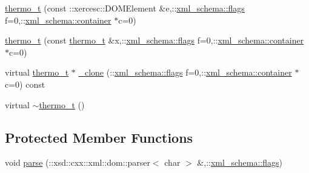 \begin{DoxyCompactItemize}
\item 
\hyperlink{classthermo__t_a9d2453469c50d26154ad9126e93da768}{thermo\-\_\-t} (const \-::xercesc\-::\-D\-O\-M\-Element \&e,\-::\hyperlink{namespacexml__schema_a0612287d030cb2732d31a45b258fdc87}{xml\-\_\-schema\-::flags} f=0,\-::\hyperlink{namespacexml__schema_ada9aa30dc722e93ee2ed7243085402a5}{xml\-\_\-schema\-::container} $\ast$c=0)
\item 
\hyperlink{classthermo__t_a524ba6dfc3781a5ee2a86e674097ff00}{thermo\-\_\-t} (const \hyperlink{classthermo__t}{thermo\-\_\-t} \&x,\-::\hyperlink{namespacexml__schema_a0612287d030cb2732d31a45b258fdc87}{xml\-\_\-schema\-::flags} f=0,\-::\hyperlink{namespacexml__schema_ada9aa30dc722e93ee2ed7243085402a5}{xml\-\_\-schema\-::container} $\ast$c=0)
\item 
virtual \hyperlink{classthermo__t}{thermo\-\_\-t} $\ast$ \hyperlink{classthermo__t_a879a6032b26ce6be5227b0f9841401c2}{\-\_\-clone} (\-::\hyperlink{namespacexml__schema_a0612287d030cb2732d31a45b258fdc87}{xml\-\_\-schema\-::flags} f=0,\-::\hyperlink{namespacexml__schema_ada9aa30dc722e93ee2ed7243085402a5}{xml\-\_\-schema\-::container} $\ast$c=0) const 
\item 
virtual \hyperlink{classthermo__t_af1f580af388c6d697df6fe432928e7c3}{$\sim$thermo\-\_\-t} ()
\end{DoxyCompactItemize}
\subsection*{Protected Member Functions}
\begin{DoxyCompactItemize}
\item 
void \hyperlink{classthermo__t_ad904ca357fb42ae48a78d887fecf1f00}{parse} (\-::xsd\-::cxx\-::xml\-::dom\-::parser$<$ char $>$ \&,\-::\hyperlink{namespacexml__schema_a0612287d030cb2732d31a45b258fdc87}{xml\-\_\-schema\-::flags})
\end{DoxyCompactItemize}
